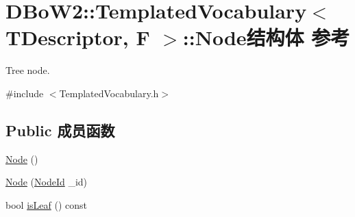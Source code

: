 \hypertarget{structDBoW2_1_1TemplatedVocabulary_1_1Node}{\section{D\-Bo\-W2\-:\-:Templated\-Vocabulary$<$ T\-Descriptor, F $>$\-:\-:Node结构体 参考}
\label{structDBoW2_1_1TemplatedVocabulary_1_1Node}
}


Tree node.  




{\ttfamily \#include $<$Templated\-Vocabulary.\-h$>$}

\subsection*{Public 成员函数}
\begin{DoxyCompactItemize}
\item 
\hyperlink{structDBoW2_1_1TemplatedVocabulary_1_1Node_a1339ee00108c4c652cd1ca55a37c3fd3}{Node} ()
\item 
\hyperlink{structDBoW2_1_1TemplatedVocabulary_1_1Node_a9f1fcb620025ba6103a47e5c2b169cd6}{Node} (\hyperlink{namespaceDBoW2_a3a0fa9c50c0df508759362d6204566f2}{Node\-Id} \-\_\-id)
\item 
bool \hyperlink{structDBoW2_1_1TemplatedVocabulary_1_1Node_a163e5d59292f2cf694b67089b37f79be}{is\-Leaf} () const 
\end{DoxyCompactItemize}

